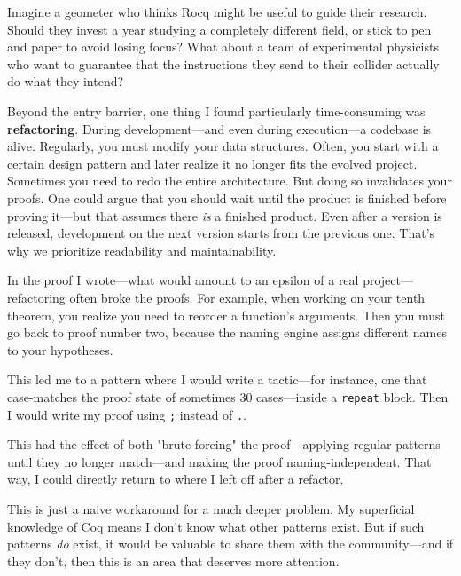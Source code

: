 \documentclass[11pt]{article}
\begin{document}
Imagine a geometer who thinks Rocq might be useful to guide their research. Should they invest a year studying a completely different field, or stick to pen and paper to avoid losing focus? What about a team of experimental physicists who want to guarantee that the instructions they send to their collider actually do what they intend?

Beyond the entry barrier, one thing I found particularly time-consuming was \textbf{refactoring}. During development---and even during execution---a codebase is alive. Regularly, you must modify your data structures. Often, you start with a certain design pattern and later realize it no longer fits the evolved project. Sometimes you need to redo the entire architecture. But doing so invalidates your proofs. One could argue that you should wait until the product is finished before proving it---but that assumes there \textit{is} a finished product. Even after a version is released, development on the next version starts from the previous one. That's why we prioritize readability and maintainability.

In the proof I wrote---what would amount to an epsilon of a real project---refactoring often broke the proofs. For example, when working on your tenth theorem, you realize you need to reorder a function's arguments. Then you must go back to proof number two, because the naming engine assigns different names to your hypotheses.

This led me to a pattern where I would write a tactic---for instance, one that case-matches the proof state of sometimes 30 cases---inside a \texttt{repeat} block. Then I would write my proof using \texttt{;} instead of \texttt{.}.

This had the effect of both "brute-forcing" the proof---applying regular patterns until they no longer match---and making the proof naming-independent. That way, I could directly return to where I left off after a refactor.

This is just a naive workaround for a much deeper problem. My superficial knowledge of Coq means I don't know what other patterns exist. But if such patterns \textit{do} exist, it would be valuable to share them with the community---and if they don't, then this is an area that deserves more attention.
\end{document}
